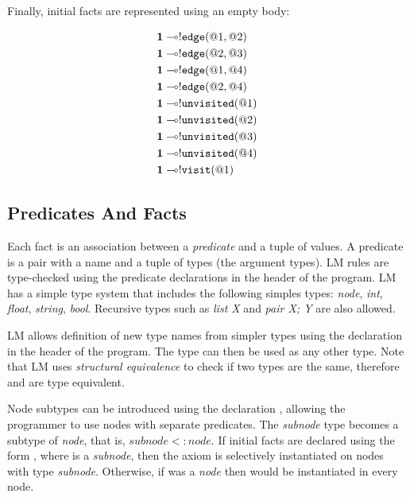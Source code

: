 Finally, initial facts are represented using an empty body:

\nopagebreak

\begin{align}
\mathbf{1} \multimap & {!} \mathtt{edge}(@1, @2) \\
\mathbf{1} \multimap & {!} \mathtt{edge}(@2, @3) \\
\mathbf{1} \multimap & {!} \mathtt{edge}(@1, @4) \\
\mathbf{1} \multimap & {!} \mathtt{edge}(@2, @4) \\
\mathbf{1} \multimap & {!} \mathtt{unvisited}(@1)  \\
\mathbf{1} \multimap & {!} \mathtt{unvisited}(@2) \\
\mathbf{1} \multimap & {!} \mathtt{unvisited}(@3) \\
\mathbf{1} \multimap & {!} \mathtt{unvisited}(@4) \\
\mathbf{1} \multimap & {!} \mathtt{visit}(@1)
\end{align}

\subsection{Predicates And Facts}

Each fact is an association between a \emph{predicate} and a tuple of values. A
predicate is a pair with a name and a tuple of types (the argument types). LM
rules are type-checked using the predicate declarations in the header of the
program. LM has a simple type system that includes the following simples types:
\emph{node}, \emph{int}, \emph{float}, \emph{string}, \emph{bool}. Recursive
types such as \emph{list X} and \emph{pair X; Y} are also allowed.

LM allows definition of new type names from simpler types using the declaration
 in the header of the program. The type
 can then be used as any other type. Note that LM uses
\emph{structural equivalence} to check if two types are the same, therefore
 and  are type equivalent.

Node subtypes can be introduced using the declaration ,
allowing the programmer to use nodes with separate predicates.  The
\emph{subnode} type becomes a subtype of \emph{node}, that is, $subnode <:
node$. If initial facts are declared using the form , where  is a
\emph{subnode}, then the axiom is selectively instantiated on nodes with type
\emph{subnode}. Otherwise, if  was a \emph{node} then  would
be instantiated in every node.

